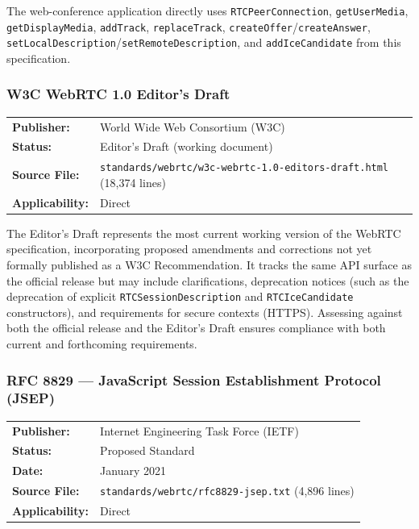 \documentclass[11pt,letterpaper]{article}
\begin{document}
The web-conference application directly uses \texttt{RTCPeerConnection}, \texttt{getUserMedia}, \texttt{getDisplayMedia}, \texttt{addTrack}, \texttt{replaceTrack}, \texttt{createOffer}/\texttt{createAnswer}, \texttt{setLocalDescription}/\texttt{setRemoteDescription}, and \texttt{addIceCandidate} from this specification.

\subsubsection{W3C WebRTC 1.0 Editor's Draft}
\label{app:w3c-webrtc-ed}

\begin{tabular}{ll}
\textbf{Publisher:} & World Wide Web Consortium (W3C) \\
\textbf{Status:} & Editor's Draft (working document) \\
\textbf{Source File:} & \texttt{standards/webrtc/w3c-webrtc-1.0-editors-draft.html} (18,374 lines) \\
\textbf{Applicability:} & Direct \\
\end{tabular}

\vspace{0.5em}
The Editor's Draft represents the most current working version of the WebRTC specification, incorporating proposed amendments and corrections not yet formally published as a W3C Recommendation. It tracks the same API surface as the official release but may include clarifications, deprecation notices (such as the deprecation of explicit \texttt{RTCSessionDescription} and \texttt{RTCIceCandidate} constructors), and requirements for secure contexts (HTTPS). Assessing against both the official release and the Editor's Draft ensures compliance with both current and forthcoming requirements.

\subsubsection{RFC 8829 --- JavaScript Session Establishment Protocol (JSEP)}
\label{app:rfc8829}

\begin{tabular}{ll}
\textbf{Publisher:} & Internet Engineering Task Force (IETF) \\
\textbf{Status:} & Proposed Standard \\
\textbf{Date:} & January 2021 \\
\textbf{Source File:} & \texttt{standards/webrtc/rfc8829-jsep.txt} (4,896 lines) \\
\textbf{Applicability:} & Direct \\
\end{tabular}
\end{document}
